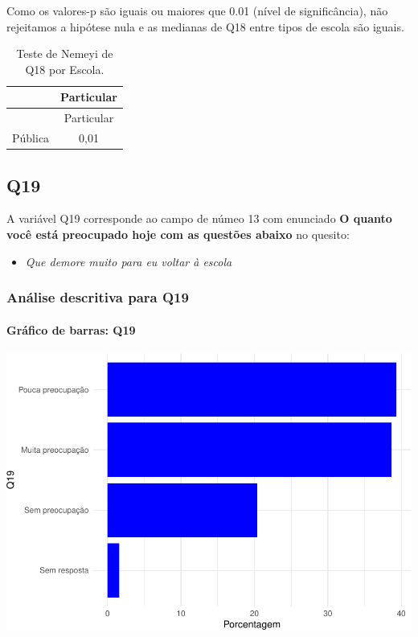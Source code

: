 \documentclass[]{article}
\providecommand{\tightlist}{%
  \setlength{\itemsep}{0pt}\setlength{\parskip}{0pt}}
\let\oldparagraph\paragraph
\renewcommand{\paragraph}[1]{\oldparagraph{#1}\mbox{}}
\begin{document}
Como os valores-p são iguais ou maiores que 0.01 (nível de significância), não rejeitamos a hipótese nula e as medianas de Q18 entre tipos de escola são iguais.

\begin{longtable}[]{@{}lc@{}}
\caption{\label{tab:unnamed-chunk-298}Teste de Nemeyi de Q18 por Escola.}\tabularnewline
\toprule
& Particular\tabularnewline
\midrule
\endfirsthead
\toprule
& Particular\tabularnewline
\midrule
\endhead
Pública & 0,01\tabularnewline
\bottomrule
\end{longtable}

\cleardoublepage

\hypertarget{q19}{%
\subsection{Q19}\label{q19}}

A variável Q19 corresponde ao campo de númeo 13 com enunciado \textbf{O quanto você está preocupado hoje com as questões abaixo} no quesito:

\begin{itemize}
\tightlist
\item
  \emph{Que demore muito para eu voltar à escola}
\end{itemize}

\hypertarget{anuxe1lise-descritiva-para-q19}{%
\subsubsection{Análise descritiva para Q19}\label{anuxe1lise-descritiva-para-q19}}

\hypertarget{gruxe1fico-de-barras-q19}{%
\paragraph{Gráfico de barras: Q19}\label{gruxe1fico-de-barras-q19}}

\begin{center}\includegraphics[width=0.75\linewidth]{relatorio_covid19_files/figure-latex/unnamed-chunk-305-1} \end{center}
\end{document}

